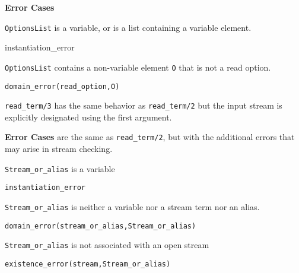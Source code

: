 \begin{description}
{\bf Error Cases}
\bi
\item 	{\tt OptionsList} is a variable, or is a list containing a
	variable element. 
\bi 
\item instantiation\_error
\ei
\item     {\tt OptionsList} contains a non-variable element {\tt O} that is not
	a read option.
\bi
\item 	{\tt domain\_error(read\_option,O)}
\ei
\ei


%
{\tt read\_term/3} has the same behavior as {\tt read\_term/2} but
the input stream is explicitly designated using the first argument.

{\bf Error Cases} are the same as {\tt read\_term/2}, but with the
additional errors that may arise in stream checking.
\bi
\item 	{\tt Stream\_or\_alias} is a variable
\bi
\item {\tt instantiation\_error}
\ei
\item 	{\tt Stream\_or\_alias} is neither a variable nor a stream term nor an alias.
\bi
\item 	{\tt domain\_error(stream\_or\_alias,Stream\_or\_alias)}
\ei
\item 	{\tt Stream\_or\_alias} is not associated with an open stream
\bi
\item 	{\tt existence\_error(stream,Stream\_or\_alias)}
\ei
\ei


\end{description}
